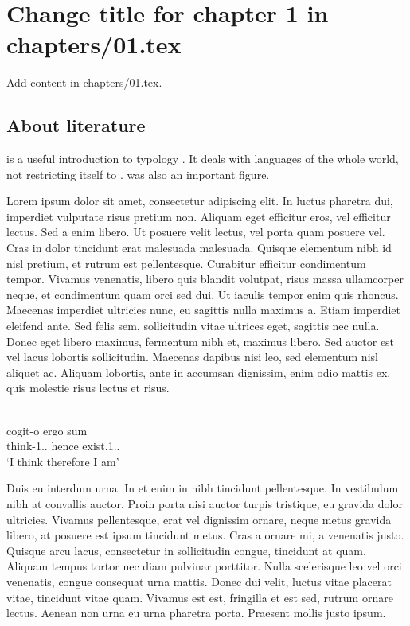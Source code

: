 \chapter{Change title for chapter 1 in chapters/01.tex}
Add content in chapters/01.tex.

\section{About literature}
\citet{Comrie1981} is a useful introduction to typology . %
It deals with languages of the whole world, not restricting itself to . %
 was also an important figure. %

Lorem ipsum dolor sit amet, consectetur adipiscing elit. In luctus pharetra dui, imperdiet vulputate risus pretium non. Aliquam eget efficitur eros, vel efficitur lectus. Sed a enim libero. Ut posuere velit lectus, vel porta quam posuere vel. Cras in dolor tincidunt erat malesuada malesuada. Quisque elementum nibh id nisl pretium, et rutrum est pellentesque. Curabitur efficitur condimentum tempor. Vivamus venenatis, libero quis blandit volutpat, risus massa ullamcorper neque, et condimentum quam orci sed dui. Ut iaculis tempor enim quis rhoncus. Maecenas imperdiet ultricies nunc, eu sagittis nulla maximus a. Etiam imperdiet eleifend ante. Sed felis sem, sollicitudin vitae ultrices eget, sagittis nec nulla. Donec eget libero maximus, fermentum nibh et, maximus libero. Sed auctor est vel lacus lobortis sollicitudin. Maecenas dapibus nisi leo, sed elementum nisl aliquet ac. Aliquam lobortis, ante in accumsan dignissim, enim odio mattis ex, quis molestie risus lectus et risus. 

\ea\label{ex:1:descartes}
\\
\gll cogit-o ergo sum \\
     think-1{\sg}.{\prs}.{\ind} hence exist.1{\sg}.{\prs}.{\ind}\\
\glt `I think therefore I am'
\z

Duis eu interdum urna. In et enim in nibh tincidunt pellentesque. In vestibulum nibh at convallis auctor. Proin porta nisi auctor turpis tristique, eu gravida dolor ultricies. Vivamus pellentesque, erat vel dignissim ornare, neque metus gravida libero, at posuere est ipsum tincidunt metus. Cras a ornare mi, a venenatis justo. Quisque arcu lacus, consectetur in sollicitudin congue, tincidunt at quam. Aliquam tempus tortor nec diam pulvinar porttitor. Nulla scelerisque leo vel orci venenatis, congue consequat urna mattis. Donec dui velit, luctus vitae placerat vitae, tincidunt vitae quam. Vivamus est est, fringilla et est sed, rutrum ornare lectus. Aenean non urna eu urna pharetra porta. Praesent mollis justo ipsum. 

